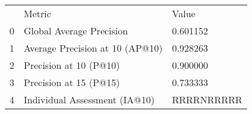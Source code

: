 \begin{tabular}{lll}
 & Metric & Value \\
0 & Global Average Precision & 0.601152 \\
1 & Average Precision at 10 (AP@10) & 0.928263 \\
2 & Precision at 10 (P@10) & 0.900000 \\
3 & Precision at 15 (P@15) & 0.733333 \\
4 & Individual Assessment (IA@10) & RRRRNRRRRR \\
\end{tabular}
